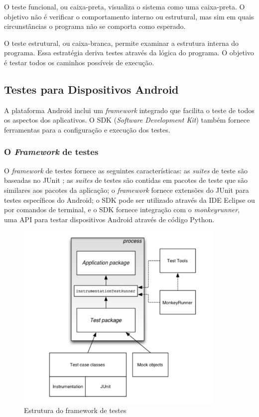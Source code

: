 O teste funcional, ou caixa-preta, visualiza o sistema como uma caixa-preta. O objetivo não é verificar o comportamento interno ou estrutural, mas sim em quais circunstâncias o programa não se comporta como esperado\cite{myers2011}.

O teste estrutural, ou caixa-branca, permite examinar a estrutura interna do programa. Essa estratégia deriva testes através da lógica do programa. O objetivo é testar todos os caminhos possíveis de execução\cite{myers2011}.

  \subsection{Testes para Dispositivos Android}

A plataforma Android inclui um \textit{framework} integrado que facilita o teste de todos os aspectos dos aplicativos. O SDK (\textit{Software Development Kit}) também fornece ferramentas para a configuração e execução dos testes.

    \subsubsection{O \textit{Framework} de testes}

O \textit{framework} de testes fornece as seguintes características: as \textit{suites} de teste são baseadas no JUnit \cite{junit2015}; as \textit{suites} de testes são contidas em pacotes de teste que são similares aos pacotes da aplicação; o \textit{framework} fornece extensões do JUnit para testes específicos do Android; o SDK pode ser utilizado através da IDE Eclipse ou por comandos de terminal, e o SDK fornece integração com o \textit{monkeyrunner}, uma API para testar dispositivos Android através de código Python.

\begin{figure}[H]
  \centering
  \includegraphics[width=10cm]{figuras/android_test.png}
  \caption{Estrutura do framework de testes \cite{androidTesting2015}}
  \label{figura:testes}
\end{figure}

